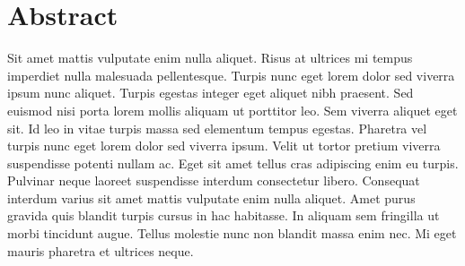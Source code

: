 \chapter*{Abstract}
Sit amet mattis vulputate enim nulla aliquet. Risus at ultrices mi tempus imperdiet nulla malesuada pellentesque. Turpis nunc eget lorem dolor sed viverra ipsum nunc aliquet. Turpis egestas integer eget aliquet nibh praesent. Sed euismod nisi porta lorem mollis aliquam ut porttitor leo. Sem viverra aliquet eget sit. Id leo in vitae turpis massa sed elementum tempus egestas. Pharetra vel turpis nunc eget lorem dolor sed viverra ipsum. Velit ut tortor pretium viverra suspendisse potenti nullam ac. Eget sit amet tellus cras adipiscing enim eu turpis. Pulvinar neque laoreet suspendisse interdum consectetur libero. Consequat interdum varius sit amet mattis vulputate enim nulla aliquet. Amet purus gravida quis blandit turpis cursus in hac habitasse. In aliquam sem fringilla ut morbi tincidunt augue. Tellus molestie nunc non blandit massa enim nec. Mi eget mauris pharetra et ultrices neque.
